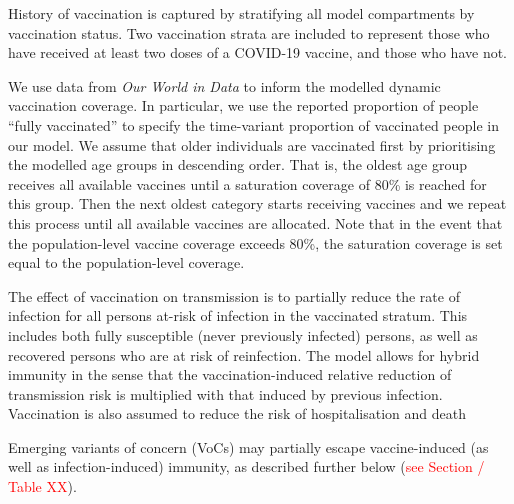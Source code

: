 
History of vaccination is captured by stratifying all model compartments by vaccination status.
Two vaccination strata are included to represent those who have received at least two doses of a COVID-19 vaccine,
and those who have not.

We use data from \textit{Our World in Data} to inform the modelled dynamic vaccination coverage. In particular, we use the reported proportion of 
people ``fully vaccinated'' to specify the time-variant proportion of vaccinated people in our model. We assume that older individuals are vaccinated 
first by prioritising the modelled age groups in descending order. That is, the oldest age group receives all available vaccines until a 
saturation coverage of 80\% is reached for this group. Then the next oldest category starts receiving vaccines and we repeat this process until all available vaccines
are allocated. Note that in the event that the population-level vaccine coverage exceeds 80\%, the saturation coverage is set equal to the population-level coverage. 

The effect of vaccination on transmission is to partially reduce the rate of infection for all persons at-risk of infection in the vaccinated stratum.
This includes both fully susceptible (never previously infected) persons,
as well as recovered persons who are at risk of reinfection. The model allows for hybrid immunity
in the sense that the vaccination-induced relative reduction of transmission risk is multiplied with that induced by previous infection. Vaccination is also assumed to reduce the risk of hospitalisation and death 

Emerging variants of concern (VoCs) may partially escape vaccine-induced (as well as infection-induced) immunity, as described further below (\textcolor{red}{see Section / Table XX}).

